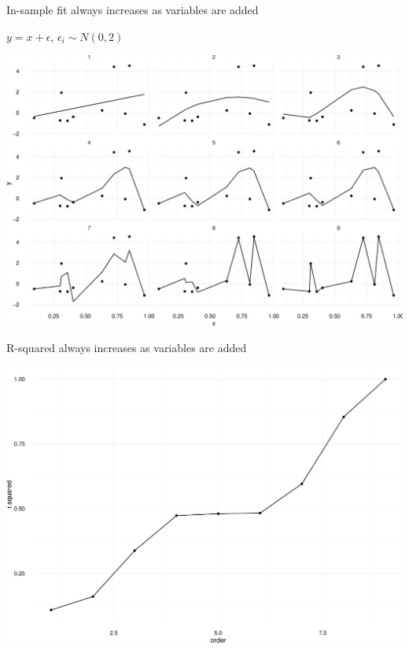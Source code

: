 \documentclass[ignorenonframetext,]{beamer}
\begin{document}
\begin{frame}{In-sample fit always increases as variables are added}

\(y = x + \epsilon\), \(\epsilon_i \sim N(0, 2)\)

\includegraphics{r2_regression_fit_files/figure-beamer/unnamed-chunk-5-1.pdf}

\end{frame}

\begin{frame}{R-squared always increases as variables are added}

\includegraphics{r2_regression_fit_files/figure-beamer/unnamed-chunk-6-1.pdf}

\end{frame}
\end{document}
